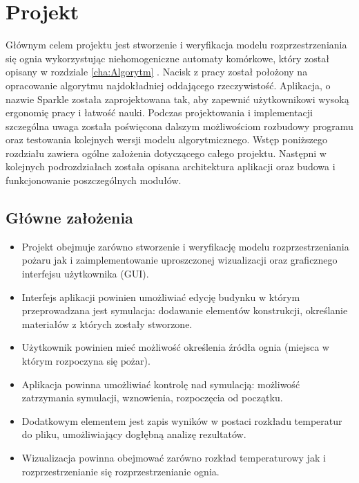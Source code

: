 \chapter {Projekt}
Głównym celem projektu jest stworzenie i weryfikacja modelu rozprzestrzeniania się ognia wykorzystując niehomogeniczne automaty
komórkowe, który został opisany w rozdziale \ref{cha:Algorytm} . Nacisk z pracy został położony na opracowanie algorytmu najdokładniej oddającego rzeczywistość.
Aplikacja, o nazwie Sparkle została zaprojektowana tak, aby zapewnić użytkownikowi wysoką ergonomię pracy i łatwość nauki.
Podczas projektowania i implementacji szczególna uwaga została poświęcona dalszym możliwościom rozbudowy programu oraz testowania 
kolejnych wersji modelu algorytmicznego. Wstęp poniższego rozdziału zawiera ogólne założenia dotyczącego całego projektu. 
Następni w kolejnych podrozdziałach została opisana architektura aplikacji oraz budowa i funkcjonowanie poszczególnych modułów.
\label{cha:projekt}
\section {Główne założenia}
\begin {itemize}
\item Projekt obejmuje zarówno stworzenie i weryfikację modelu rozprzestrzeniania pożaru jak i zaimplementowanie uproszczonej wizualizacji oraz graficznego interfejsu użytkownika (GUI).
\item Interfejs aplikacji powinien umożliwiać edycję budynku w którym przeprowadzana jest symulacja: dodawanie elementów konstrukcji, 
określanie materiałów z których zostały stworzone. 
\item Użytkownik powinien mieć możliwość określenia źródła ognia (miejsca w którym rozpoczyna się pożar).
\item Aplikacja powinna umożliwiać kontrolę nad symulacją: możliwość zatrzymania symulacji, wznowienia, rozpoczęcia od początku.
\item Dodatkowym elementem jest zapis wyników w postaci rozkładu temperatur do pliku, umożliwiający dogłębną analizę rezultatów.
\item Wizualizacja powinna obejmować zarówno rozkład temperaturowy jak i rozprzestrzenianie się rozprzestrzenianie ognia. 
\end {itemize}
